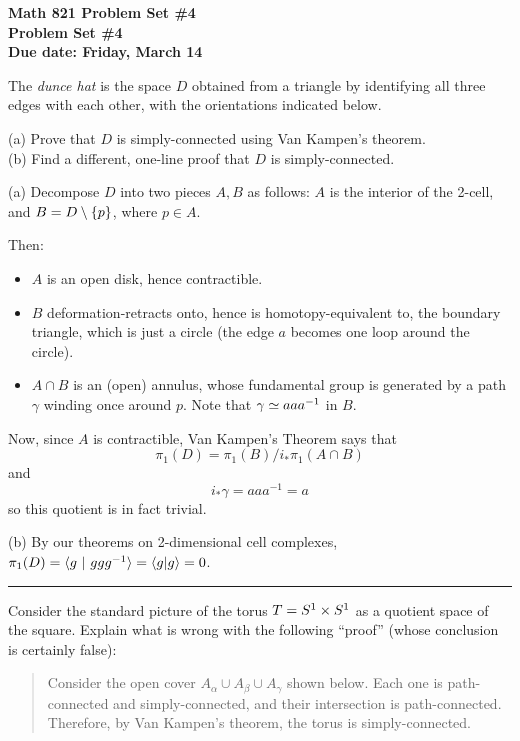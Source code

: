 
\usepackage{youngtab}

\thispagestyle{empty}
{\bf Math 821 Problem Set \#4\\
Problem Set \#4\\
Due date: Friday, March 14}
\bigskip


\prob The \emph{dunce hat} is the space $D$ obtained from a triangle
by identifying all three edges with each other, with the orientations
indicated below.

(a) Prove that $D$ is simply-connected using Van Kampen's theorem.\\

(b) Find a different, one-line proof that $D$ is simply-connected.


\soln

(a) Decompose $D$ into two pieces $A,B$ as follows: $A$ is the
interior of the 2-cell, and $B=D\setminus\{p\}$, where $p\in A$.

Then:
\begin{itemize}
\item $A$ is an open disk, hence contractible.
\item $B$ deformation-retracts onto, hence is homotopy-equivalent
to, the boundary triangle, which is just a circle (the
edge $a$ becomes one loop around the circle).
\item $A\cap B$ is an (open) annulus, whose fundamental group is
generated by a path $\gamma$ winding once around $p$.
Note that $\gamma\simeq aaa^{-1}$ in $B$.
\end{itemize}
Now,
since $A$ is contractible, Van Kampen's Theorem says that
  $$\pi_1(D) = \pi_1(B) / i_*\pi_1(A\cap B)$$
and
  $$i_*\gamma=aaa^{-1}=a$$
so this quotient is in fact trivial.

(b) By our theorems on 2-dimensional cell complexes, $\pi_1(D)=\langle g ~|~ ggg^{-1}\rangle=\langle g|g\rangle=0$.

\vfill\hrule\vfill\pagebreak

\prob Consider the standard picture of the torus $T=S^1\times S^1$
as a quotient space of the square.  Explain what is wrong with the following ``proof''
(whose conclusion is certainly false):

\begin{quotation}
Consider the open cover $A_\alpha\cup A_\beta\cup A_\gamma$ shown below.
Each one is path-connected and simply-connected, and their intersection is path-connected.
Therefore, by Van Kampen's theorem, the torus is simply-connected.
\end{quotation}

